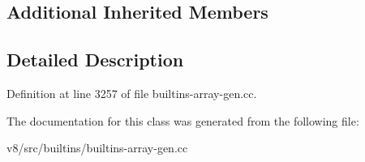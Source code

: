 \subsection*{Additional Inherited Members}


\subsection{Detailed Description}


Definition at line 3257 of file builtins-\/array-\/gen.\+cc.



The documentation for this class was generated from the following file\+:\begin{DoxyCompactItemize}
\item 
v8/src/builtins/builtins-\/array-\/gen.\+cc\end{DoxyCompactItemize}
